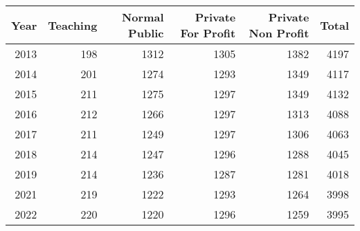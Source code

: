 \begin{tabular}{rrrrrr}
  \toprule
Year & Teaching & Normal Public & Private For Profit & Private Non Profit & Total \\ 
  \midrule
2013 & 198 & 1312 & 1305 & 1382 & 4197 \\ 
  2014 & 201 & 1274 & 1293 & 1349 & 4117 \\ 
  2015 & 211 & 1275 & 1297 & 1349 & 4132 \\ 
  2016 & 212 & 1266 & 1297 & 1313 & 4088 \\ 
  2017 & 211 & 1249 & 1297 & 1306 & 4063 \\ 
  2018 & 214 & 1247 & 1296 & 1288 & 4045 \\ 
  2019 & 214 & 1236 & 1287 & 1281 & 4018 \\ 
  2021 & 219 & 1222 & 1293 & 1264 & 3998 \\ 
  2022 & 220 & 1220 & 1296 & 1259 & 3995 \\ 
   \bottomrule
\end{tabular}

